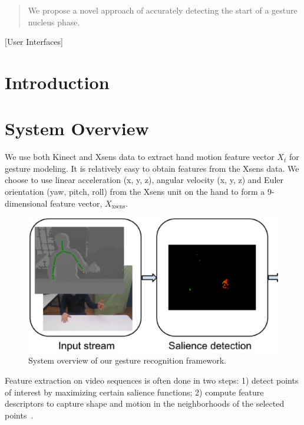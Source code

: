 \documentclass{acm_proc_article-sp}
\begin{document}
\maketitle
\begin{abstract}
We propose a novel approach of accurately detecting the start of a gesture nucleus phase.
\end{abstract}

[User Interfaces]


\section{Introduction}

\section{System Overview}
We use both Kinect and Xsens data to extract hand motion feature vector $X_t$ for gesture modeling. 
It is relatively easy to obtain features from the Xsens data. We choose to use linear
acceleration (x, y, z), angular velocity (x, y, z) and Euler orientation (yaw, pitch, roll)
from the Xsens unit on the hand to form a 9-dimensional feature vector, $X_{\text{xsens}}$.

\begin{figure}
\centering
\includegraphics[width=1\linewidth]{fig/system.ps}
\caption{System overview of our gesture recognition framework. }
\label{fig:system}
\end{figure}

Feature extraction on video sequences is often done in two steps: 1)
detect points of interest by maximizing certain salience functions; 2) compute
feature descriptors to capture shape and motion in the neighborhoods of the selected
points~\cite{wang-spatio-2009}.
\end{document}
